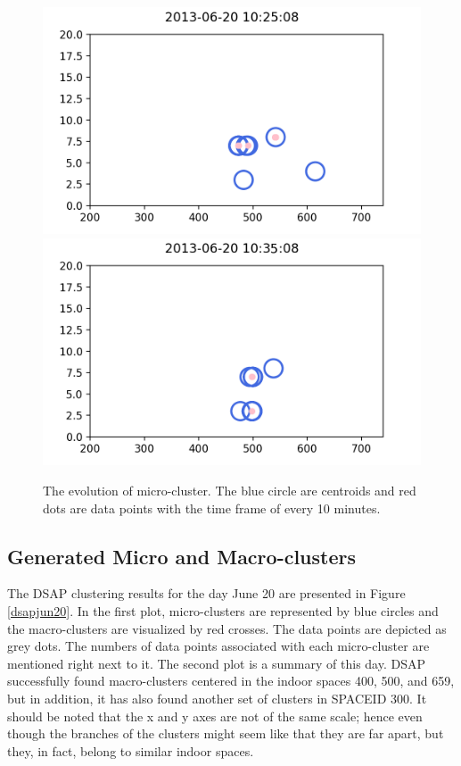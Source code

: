 \begin{figure}[!ht]
        \includegraphics[width = 5 cm]{image/Chapters/Chapter6/value327.png}\hfill
        \includegraphics[width = 5 cm]{image/Chapters/Chapter6/value343.png}\hfill
    \caption{The evolution of micro-cluster. The blue circle are centroids and red dots are data points with the time frame of every 10 minutes. }
    \label{drift}
\end{figure}



\subsection{Generated Micro and Macro-clusters}




The DSAP clustering results for the day June 20 are presented in Figure \ref{dsapjun20}. In the first plot, micro-clusters are represented by blue circles and the macro-clusters are visualized by red crosses. The data points are depicted as grey dots. The numbers of data points associated with each micro-cluster are mentioned right next to it. The second plot is a summary of this day. DSAP successfully found macro-clusters centered in the indoor spaces 400, 500, and 659, but in addition, it has also found another set of clusters in SPACEID 300. It should be noted that the x and y axes are not of the same scale; hence even though the branches of the clusters might seem like that they are far apart, but they, in fact, belong to similar indoor spaces.


 
